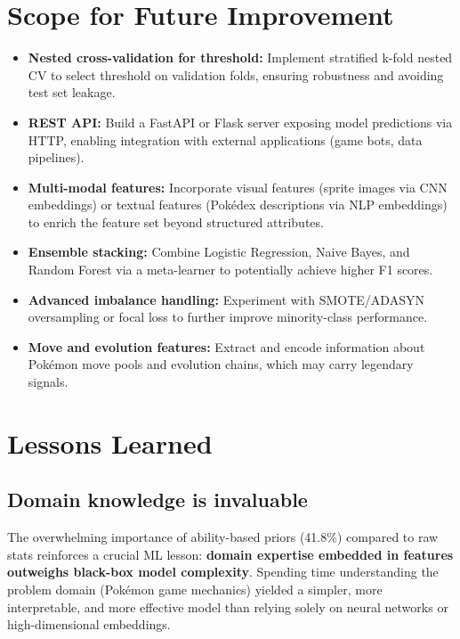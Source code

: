 \section{Scope for Future Improvement}
\label{sec:future_work}


\begin{itemize}
  \item \textbf{Nested cross-validation for threshold:} Implement stratified k-fold nested CV to select threshold on validation folds, ensuring robustness and avoiding test set leakage.
  
  \item \textbf{REST API:} Build a FastAPI or Flask server exposing model predictions via HTTP, enabling integration with external applications (game bots, data pipelines).
  
  \item \textbf{Multi-modal features:} Incorporate visual features (sprite images via CNN embeddings) or textual features (Pokédex descriptions via NLP embeddings) to enrich the feature set beyond structured attributes.
  
  \item \textbf{Ensemble stacking:} Combine Logistic Regression, Naive Bayes, and Random Forest via a meta-learner to potentially achieve higher F1 scores.
  
  \item \textbf{Advanced imbalance handling:} Experiment with SMOTE/ADASYN oversampling or focal loss to further improve minority-class performance.
  
  \item \textbf{Move and evolution features:} Extract and encode information about Pokémon move pools and evolution chains, which may carry legendary signals.
\end{itemize}

\section{Lessons Learned}
\label{sec:lessons}

\subsection{Domain knowledge is invaluable}

The overwhelming importance of ability-based priors (41.8\%) compared to raw stats reinforces a crucial ML lesson: \textbf{domain expertise embedded in features outweighs black-box model complexity}. Spending time understanding the problem domain (Pokémon game mechanics) yielded a simpler, more interpretable, and more effective model than relying solely on neural networks or high-dimensional embeddings.

